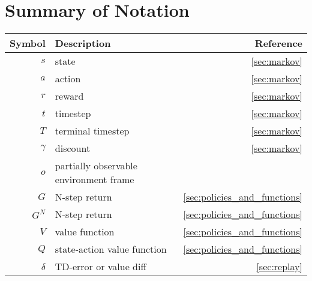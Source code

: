 \section{Summary of Notation}

\begin{tabular}{| r  l  r |}
    \hline
    \textbf{Symbol} & \textbf{Description}                   & \textbf{Reference}                       \\
    \hline
    $s$             & state                                  & \ref{sec:markov}                         \\
    $a$             & action                                 & \ref{sec:markov}                         \\
    $r$             & reward                                 & \ref{sec:markov}                         \\
    $t$             & timestep                               & \ref{sec:markov}                         \\
    $T$             & terminal timestep                      & \ref{sec:markov}                         \\
    $\gamma$        & discount                               & \ref{sec:markov}                         \\
    $o$             & partially observable environment frame                                            \\
    $G$             & N-step return                          & \ref{sec:policies_and_functions}         \\
    $G^N$           & N-step return                          & \ref{sec:policies_and_functions}         \\
    $V$             & value function                         & \ref{sec:policies_and_functions}         \\
    $Q$             & state-action value function            & \ref{sec:policies_and_functions}         \\
    $\delta$        & TD-error or value diff                 & \ref{sec:replay}                         \\

\end{tabular}
